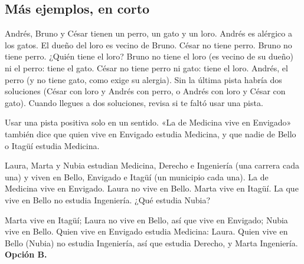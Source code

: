 \subsection{Más ejemplos, en corto}
\begin{ejemplo}[Mascotas]
Andrés, Bruno y César tienen un perro, un gato y un loro. Andrés es alérgico a los gatos. El dueño del loro es vecino de
Bruno. César no tiene perro. Bruno no tiene perro. ¿Quién tiene el loro?
\solucion Bruno no tiene el loro (es vecino de su dueño) ni el perro: tiene el gato. César no tiene perro ni gato: tiene
el loro. Andrés, el perro (y no tiene gato, como exige su alergia).
 Sin la última pista habría dos soluciones (César con loro y Andrés con perro, o Andrés con
loro y César con gato). Cuando llegues a dos soluciones, revisa si te faltó usar una pista.
\end{ejemplo}

\begin{trampa}
Usar una pista positiva solo en un sentido. «La de Medicina vive en Envigado» también dice que quien vive en Envigado
estudia Medicina, y que nadie de Bello o Itagüí estudia Medicina.
\end{trampa}

\begin{reto}
Laura, Marta y Nubia estudian Medicina, Derecho e Ingeniería (una carrera cada una) y viven en Bello, Envigado e Itagüí
(un municipio cada una). La de Medicina vive en Envigado. Laura no vive en Bello. Marta vive en Itagüí. La que vive en
Bello no estudia Ingeniería. ¿Qué estudia Nubia?
\end{reto}

\begin{retoresuelto}
Marta vive en Itagüí; Laura no vive en Bello, así que vive en Envigado; Nubia vive en Bello. Quien vive en Envigado
estudia Medicina: Laura. Quien vive en Bello (Nubia) no estudia Ingeniería, así que estudia Derecho, y Marta Ingeniería.
\textbf{Opción B.}
\end{retoresuelto}

